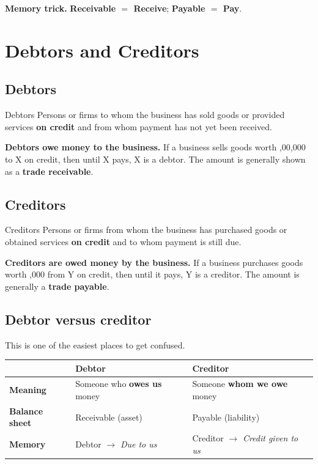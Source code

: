 \documentclass[11pt,a4paper]{article}
\newcommand{\Rs}{\ifmmode\text{\rsfont ₹}\else{\rsfont ₹}\fi}
\begin{document}
\textbf{Memory trick.} \textbf{Receivable $=$ Receive}; \textbf{Payable $=$ Pay}.

\section{Debtors and Creditors}

\subsection{Debtors}

\begin{defbox}{Debtors}
Persons or firms to whom the business has sold goods or provided services \textbf{on credit} and from whom payment
has not yet been received.
\end{defbox}

\textbf{Debtors owe money to the business.} If a business sells goods worth \Rs 1,00,000 to X on credit, then until
X pays, X is a debtor. The amount is generally shown as a \textbf{trade receivable}.

\subsection{Creditors}

\begin{defbox}{Creditors}
Persons or firms from whom the business has purchased goods or obtained services \textbf{on credit} and to whom
payment is still due.
\end{defbox}

\textbf{Creditors are owed money by the business.} If a business purchases goods worth \Rs 80,000 from Y on credit,
then until it pays, Y is a creditor. The amount is generally a \textbf{trade payable}.

\subsection{Debtor versus creditor}

This is one of the easiest places to get confused.

\begin{center}
\small
\begin{tabularx}{\textwidth}{@{}l Y Y@{}}
\toprule
{} & \textbf{Debtor} & \textbf{Creditor}\\
\midrule
\textbf{Meaning} & Someone who \textbf{owes us} money & Someone \textbf{whom we owe} money\\
\textbf{Balance sheet} & Receivable (asset) & Payable (liability)\\
\textbf{Memory} & Debtor $\rightarrow$ \emph{Due to us} & Creditor $\rightarrow$ \emph{Credit given to us}\\
\bottomrule
\end{tabularx}
\end{center}
\end{document}
